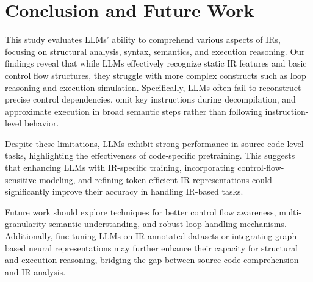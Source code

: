 \section{Conclusion and Future Work}
\label{sec:conclusion}

This study evaluates LLMs’ ability to comprehend various aspects of IRs, focusing on structural analysis, syntax, semantics, and execution reasoning. Our findings reveal that while LLMs effectively recognize static IR features and basic control flow structures, they struggle with more complex constructs such as loop reasoning and execution simulation. Specifically, LLMs often fail to reconstruct precise control dependencies, omit key instructions during decompilation, and approximate execution in broad semantic steps rather than following instruction-level behavior.

Despite these limitations, LLMs exhibit strong performance in source-code-level tasks, highlighting the effectiveness of code-specific pretraining. This suggests that enhancing LLMs with IR-specific training, incorporating control-flow-sensitive modeling, and refining token-efficient IR representations could significantly improve their accuracy in handling IR-based tasks.

Future work should explore techniques for better control flow awareness, multi-granularity semantic understanding, and robust loop handling mechanisms. Additionally, fine-tuning LLMs on IR-annotated datasets or integrating graph-based neural representations may further enhance their capacity for structural and execution reasoning, bridging the gap between source code comprehension and IR analysis.







